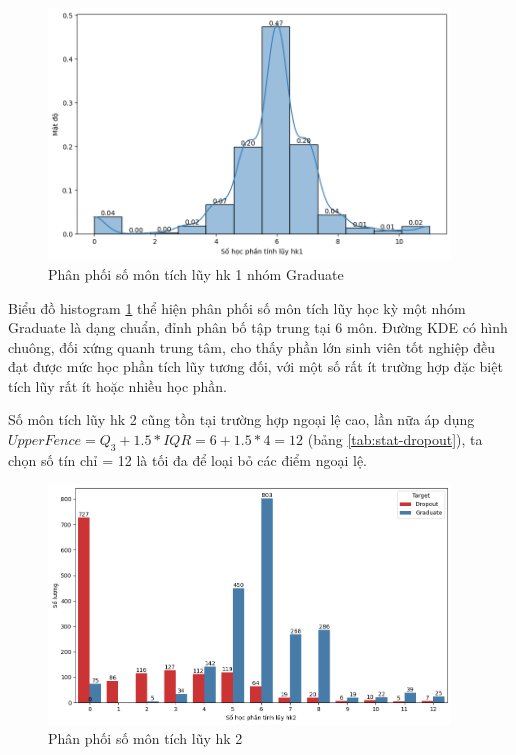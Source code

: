     \begin{figure}[htp]
        \centering
        \includegraphics[width=0.95\textwidth]{images/Table_Dropout_Sem1Units_Graduate.png}
        \caption{Phân phối số môn tích lũy hk 1 nhóm Graduate}
        \label{fig:Table_Dropout_Sem1Units_Graduate}
    \end{figure}

    \FloatBarrier

     Biểu đồ histogram \ref{fig:Table_Dropout_Sem1Units_Graduate} thể hiện phân phối số môn tích lũy học kỳ một nhóm Graduate là dạng chuẩn, đỉnh phân bố tập trung tại 6 môn. Đường KDE có hình chuông, đối xứng quanh trung tâm, cho thấy phần lớn sinh viên tốt nghiệp đều đạt được mức học phần tích lũy tương đối, với một số rất ít trường hợp đặc biệt tích lũy rất ít hoặc nhiều học phần.

    Số môn tích lũy hk 2 cũng tồn tại trường hợp ngoại lệ cao, lần nữa áp dụng $UpperFence = Q_3 + 1.5 *IQR = 6 + 1.5*4 = 12$ (bảng \ref{tab:stat-dropout}), ta chọn số tín chỉ = 12 là tối đa để loại bỏ các điểm ngoại lệ. 
    
     \begin{figure}[htp]
        \centering
        \includegraphics[width=0.95\textwidth]{images/Table_Dropout_Sem2Units.png}
        \caption{Phân phối số môn tích lũy hk 2}
        \label{fig:Table_Dropout_Sem2Units}
    \end{figure}

